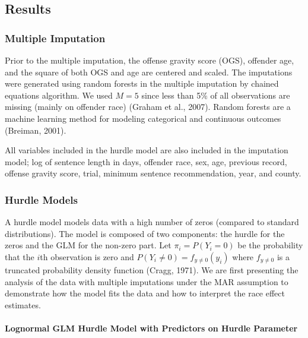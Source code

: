\documentclass[
  letterpaper,
  DIV=11,
  numbers=noendperiod]{scrartcl}
\let\oldparagraph\paragraph
\renewcommand{\paragraph}[1]{\oldparagraph{#1}\mbox{}}
\begin{document}
\hypertarget{results}{%
\subsection{Results}\label{results}}

\hypertarget{multiple-imputation}{%
\subsubsection{Multiple Imputation}\label{multiple-imputation}}

Prior to the multiple imputation, the offense gravity score (OGS),
offender age, and the square of both OGS and age are centered and
scaled. The imputations were generated using random forests in the
multiple imputation by chained equations algorithm. We used \(M = 5\)
since less than 5\% of all observations are missing (mainly on offender
race) (Graham et al., 2007). Random forests are a machine learning
method for modeling categorical and continuous outcomes (Breiman, 2001).

All variables included in the hurdle model are also included in the
imputation model; log of sentence length in days, offender race, sex,
age, previous record, offense gravity score, trial, minimum sentence
recommendation, year, and county.

\hypertarget{hurdle-models}{%
\subsubsection{Hurdle Models}\label{hurdle-models}}

A hurdle model models data with a high number of zeros (compared to
standard distributions). The model is composed of two components: the
hurdle for the zeros and the GLM for the non-zero part. Let
\(\pi_i = P(Y_i = 0)\) be the probability that the \(i\)th observation
is zero and \(P(Y_i \neq 0) = f_{y\neq 0}(y_i)\) where \(f_{y\neq 0}\)
is a truncated probability density function (Cragg, 1971). We are first
presenting the analysis of the data with multiple imputations under the
MAR assumption to demonstrate how the model fits the data and how to
interpret the race effect estimates.

\hypertarget{lognormal-glm-hurdle-model-with-predictors-on-hurdle-parameter}{%
\paragraph{Lognormal GLM Hurdle Model with Predictors on Hurdle
Parameter}\label{lognormal-glm-hurdle-model-with-predictors-on-hurdle-parameter}}
\end{document}
